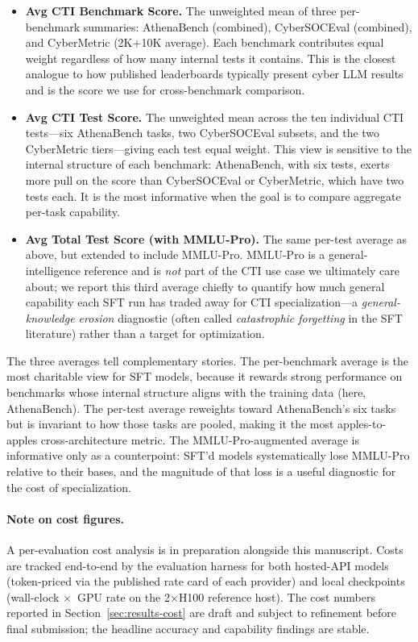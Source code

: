 \documentclass[unnumsec,webpdf,contemporary,large]{oup-authoring-template}
\theoremstyle{thmstyleone}
\theoremstyle{thmstyletwo}
\theoremstyle{thmstylethree}
\begin{document}
\begin{itemize}
  \item \textbf{Avg CTI Benchmark Score.} The unweighted mean of three per-benchmark summaries: AthenaBench (combined), CyberSOCEval (combined), and CyberMetric (2K+10K average). Each benchmark contributes equal weight regardless of how many internal tests it contains. This is the closest analogue to how published leaderboards typically present cyber LLM results and is the score we use for cross-benchmark comparison.
  \item \textbf{Avg CTI Test Score.} The unweighted mean across the ten individual CTI tests---six AthenaBench tasks, two CyberSOCEval subsets, and the two CyberMetric tiers---giving each test equal weight. This view is sensitive to the internal structure of each benchmark: AthenaBench, with six tests, exerts more pull on the score than CyberSOCEval or CyberMetric, which have two tests each. It is the most informative when the goal is to compare aggregate per-task capability.
  \item \textbf{Avg Total Test Score (with MMLU-Pro).} The same per-test average as above, but extended to include MMLU-Pro. MMLU-Pro is a general-intelligence reference and is \emph{not} part of the CTI use case we ultimately care about; we report this third average chiefly to quantify how much general capability each SFT run has traded away for CTI specialization---a \textit{general-knowledge erosion} diagnostic (often called \textit{catastrophic forgetting} in the SFT literature) rather than a target for optimization.
\end{itemize}

The three averages tell complementary stories. The per-benchmark average is the most charitable view for SFT models, because it rewards strong performance on benchmarks whose internal structure aligns with the training data (here, AthenaBench). The per-test average reweights toward AthenaBench's six tasks but is invariant to how those tasks are pooled, making it the most apples-to-apples cross-architecture metric. The MMLU-Pro-augmented average is informative only as a counterpoint: SFT'd models systematically lose MMLU-Pro relative to their bases, and the magnitude of that loss is a useful diagnostic for the cost of specialization.

\paragraph{Note on cost figures.}
A per-evaluation cost analysis is in preparation alongside this manuscript. Costs are tracked end-to-end by the evaluation harness for both hosted-API models (token-priced via the published rate card of each provider) and local checkpoints (wall-clock $\times$~GPU rate on the 2$\times$H100 reference host). The cost numbers reported in Section~\ref{sec:results-cost} are draft and subject to refinement before final submission; the headline accuracy and capability findings are stable.
\end{document}
